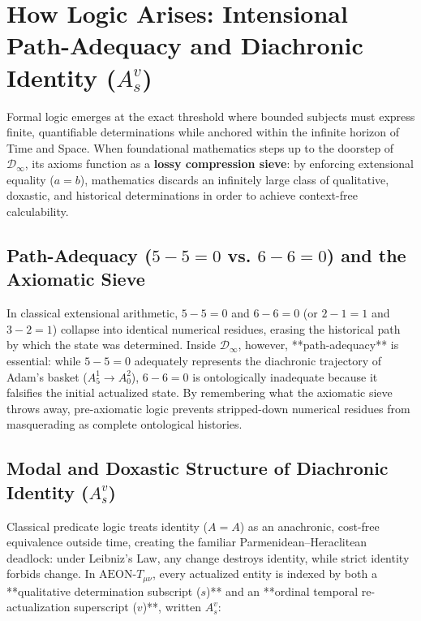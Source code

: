 \documentclass[11pt,a4paper]{article}
\begin{document}
\section{How Logic Arises: Intensional Path-Adequacy and Diachronic Identity ($A_s^v$)}

Formal logic emerges at the exact threshold where bounded subjects must express finite, quantifiable determinations while anchored within the infinite horizon of Time and Space. When foundational mathematics steps up to the doorstep of $\mathcal{D}_\infty$, its axioms function as a \textbf{lossy compression sieve}: by enforcing extensional equality ($a = b$), mathematics discards an infinitely large class of qualitative, doxastic, and historical determinations in order to achieve context-free calculability.

\subsection{Path-Adequacy ($5 - 5 = 0$ vs. $6 - 6 = 0$) and the Axiomatic Sieve}

In classical extensional arithmetic, $5 - 5 = 0$ and $6 - 6 = 0$ (or $2 - 1 = 1$ and $3 - 2 = 1$) collapse into identical numerical residues, erasing the historical path by which the state was determined. Inside $\mathcal{D}_\infty$, however, **path-adequacy** is essential: while $5 - 5 = 0$ adequately represents the diachronic trajectory of Adam's basket ($A_5^1 \to A_0^2$), $6 - 6 = 0$ is ontologically inadequate because it falsifies the initial actualized state. By remembering what the axiomatic sieve throws away, pre-axiomatic logic prevents stripped-down numerical residues from masquerading as complete ontological histories.

\subsection{Modal and Doxastic Structure of Diachronic Identity ($A_s^v$)}

Classical predicate logic treats identity ($A = A$) as an anachronic, cost-free equivalence outside time, creating the familiar Parmenidean--Heraclitean deadlock: under Leibniz's Law, any change destroys identity, while strict identity forbids change. In $\text{AEON-}T_{\mu\nu}$, every actualized entity is indexed by both a **qualitative determination subscript ($s$)** and an **ordinal temporal re-actualization superscript ($v$)**, written $A_s^v$:
\end{document}
